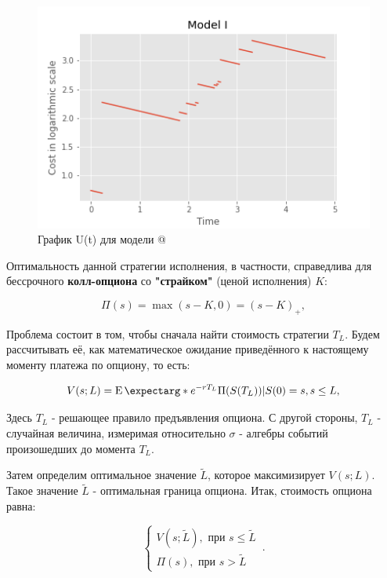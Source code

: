 \documentclass[a4paper,12pt]{article}
\makeatletter
\theoremstyle{definition}
\newcommand*{\rom}[1]{\expandafter\@slowromancap\romannumeral #1@}
\newcommand{\expect}{\operatorname{E}\expectarg}
\makeatother
\begin{document}

\begin{figure}[htbp]
\label{fig:model1track}
\centerline{\includegraphics[scale=0.7]{img/model1.png}}
\caption{График U(t) для модели \rom{1}}
\end{figure}

Оптимальность данной стратегии исполнения, в частности, справедлива для бессрочного \textbf{колл-опциона} со \textbf{"страйком"} (ценой исполнения) $K$:

\begin{equation}\label{eq:payoff_function}
\Pi(s) = \max(s - K, 0) = (s - K)_+,
\end{equation}

Проблема состоит в том, чтобы сначала найти стоимость стратегии $T_L$. Будем рассчитывать её, как математическое ожидание приведённого к настоящему моменту платежа по опциону, то есть:

\begin{equation}\label{eq:strategy_cost}
V(s; L) = \expect*{e^{-rT_L} \Pi(S(T_L)) | S(0) = s}, s \le L,
\end{equation}

Здесь $T_L$ - решающее правило предъявления опциона. С другой стороны, $T_L$ - случайная величина, измеримая относительно $\sigma$ - алгебры событий произошедших до момента $T_L$.

Затем определим оптимальное значение $\widetilde{L}$, которое максимизирует $V(s; L)$. Такое значение $\widetilde{L}$ - оптимальная граница опциона. Итак, стоимость опциона равна:

\begin{equation}\label{eq:option_price}
    \begin{cases}
      V(s; \widetilde{L}), \text{ при } s \le \widetilde{L}\\
      \Pi(s), \text{ при } s > \widetilde{L}
    \end{cases}\,.
\end{equation}
\end{document}
